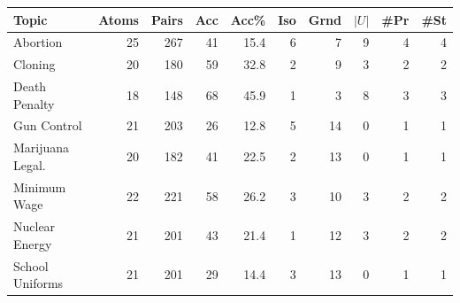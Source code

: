 \begin{tabular}{lrrrrrrrrr}
  \toprule
  Topic & Atoms & Pairs & Acc & Acc\% & Iso & Grnd & $|U|$ & \#Pr & \#St \\
  \midrule
  Abortion          & 25 & 267 & 41 & 15.4 & 6 & 7 & 9 & 4 & 4 \\
  Cloning           & 20 & 180 & 59 & 32.8 & 2 & 9 & 3 & 2 & 2 \\
  Death Penalty     & 18 & 148 & 68 & 45.9 & 1 & 3 & 8 & 3 & 3 \\
  Gun Control       & 21 & 203 & 26 & 12.8 & 5 & 14 & 0 & 1 & 1 \\
  Marijuana Legal.  & 20 & 182 & 41 & 22.5 & 2 & 13 & 0 & 1 & 1 \\
  Minimum Wage      & 22 & 221 & 58 & 26.2 & 3 & 10 & 3 & 2 & 2 \\
  Nuclear Energy    & 21 & 201 & 43 & 21.4 & 1 & 12 & 3 & 2 & 2 \\
  School Uniforms   & 21 & 201 & 29 & 14.4 & 3 & 13 & 0 & 1 & 1 \\
  \bottomrule
\end{tabular}
